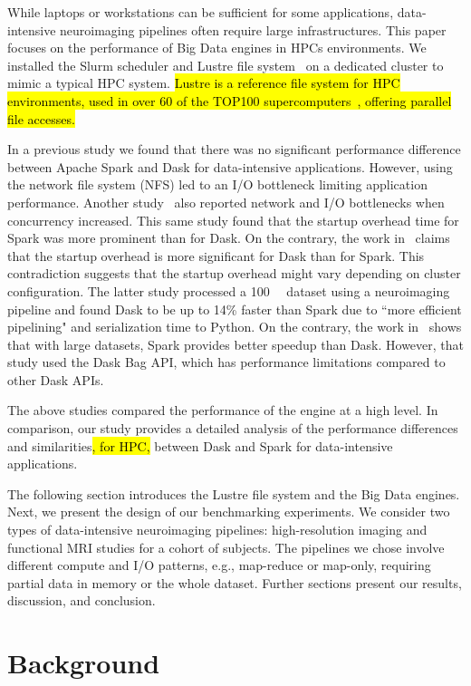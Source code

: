 \documentclass[AMA,STIX1COL]{WileyNJD-v2}
\newcommand{\HL}[1]{\hl{#1}}
\begin{document}
While laptops or workstations can be sufficient for some applications, data-intensive neuroimaging pipelines often require large infrastructures.
This paper focuses on the performance of Big Data engines in HPCs environments.
We installed the Slurm scheduler and Lustre file system~\cite{Braam2019TheLS} on a dedicated cluster to mimic a typical HPC system.
\HL{Lustre is a reference file system for HPC environments, used in over 60 of the TOP100 supercomputers~{\cite{OpenSFS-lustre}}, offering parallel file accesses.}
	
In a previous study\cite{8943502} we found that there was no significant performance difference between Apache Spark and Dask for data-intensive applications.
However, using the network file system (NFS) led to an I/O bottleneck limiting application performance.
Another study~\cite{8588652} also reported network and I/O bottlenecks when concurrency increased.
This same study found that the startup overhead time for Spark was more prominent than for Dask.
On the contrary, the work in~\cite{Mehta:17} claims that the startup overhead is more significant for Dask than for Spark.
This contradiction suggests that the startup overhead might vary depending on cluster configuration.
The latter study processed a \SI{100}{\giga\byte} dataset using a neuroimaging pipeline and found Dask to be up to 14\% faster than Spark due to ``more efficient pipelining" and serialization time to Python.
On the contrary, the work in~\cite{10.1145/3225058.3225128} shows that with large datasets, Spark provides better speedup than Dask.
However, that study used the Dask Bag API, which has performance limitations compared to other Dask APIs.
	
The above studies compared the performance of the engine at a high level.
In comparison, our study provides a detailed analysis of the performance differences
and similarities\HL{, for HPC,} between Dask and Spark for data-intensive applications.
	
The following section introduces the Lustre file system and the Big Data engines.
Next, we present the design of our benchmarking experiments.
We consider two types of data-intensive neuroimaging pipelines: high-resolution imaging and functional MRI studies for a cohort of subjects.
The pipelines we chose involve different compute and I/O patterns, e.g., map-reduce or map-only, requiring partial data in memory or the whole dataset.
Further sections present our results, discussion, and conclusion.
	
	
\section{Background}
\end{document}
